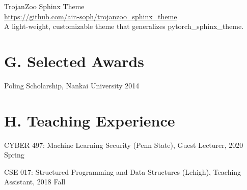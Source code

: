 \documentclass{resume}
\begin{document}
\begin{resume}
TrojanZoo Sphinx Theme \\
\url{https://github.com/ain-soph/trojanzoo_sphinx_theme} \\
A light-weight, customizable theme that generalizes pytorch\_sphinx\_theme.


\vspace{0.2in} 
\section{G. Selected Awards}
\vspace{8pt}

Poling Scholarship, Nankai University   \hfill 2014



\vspace{0.2in} 
\section{H. Teaching Experience}
\vspace{8pt}

CYBER 497: Machine Learning Security (Penn State), Guest Lecturer, 2020 Spring

CSE 017: Structured Programming and Data Structures (Lehigh), Teaching Assistant, 2018 Fall





\end{resume} 
\end{document}
